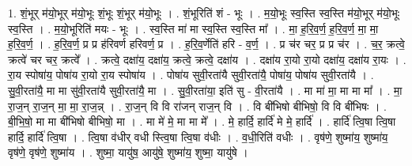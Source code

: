 \documentclass[17pt]{extarticle}
\begin{document}
1. शं॒भूर् म॑यो॒भूर् म॑यो॒भूः शं॒भूः शं॒भूर् म॑यो॒भूः । . शं॒भूरिति॑ शं - भूः । . म॒यो॒भूः स्व॒स्ति स्व॒स्ति म॑यो॒भूर् म॑यो॒भूः स्व॒स्ति । . म॒यो॒भूरिति॑ मयः - भूः । . स्व॒स्ति मा॑ मा स्व॒स्ति स्व॒स्ति मा᳚ । . मा॒ ह॒रि॒व॒र्ण॒ ह॒रि॒व॒र्ण॒ मा॒ मा॒ ह॒रि॒व॒र्ण॒ । . ह॒रि॒व॒र्ण॒ प्र प्र ह॑रिवर्ण हरिवर्ण॒ प्र । . ह॒रि॒व॒र्णेति॑ हरि - व॒र्ण॒ । . प्र च॑र चर॒ प्र प्र च॑र । . च॒र॒ क्रत्वे॒ क्रत्वे॑ चर चर॒ क्रत्वे᳚ । . क्रत्वे॒ दक्षा॑य॒ दक्षा॑य॒ क्रत्वे॒ क्रत्वे॒ दक्षा॑य । . दक्षा॑य रा॒यो रा॒यो दक्षा॑य॒ दक्षा॑य रा॒यः । . रा॒य स्पोषा॑य॒ पोषा॑य रा॒यो रा॒य स्पोषा॑य । . पोषा॑य सुवी॒रता॑यै सुवी॒रता॑यै॒ पोषा॑य॒ पोषा॑य सुवी॒रता॑यै । . सु॒वी॒रता॑यै॒ मा मा सु॑वी॒रता॑यै सुवी॒रता॑यै॒ मा । . सु॒वी॒रता॑या॒ इति॑ सु - वी॒रता॑यै । . मा मा॑ मा॒ मा मा मा᳚ । . मा॒ रा॒ज॒न् रा॒ज॒न् मा॒ मा॒ रा॒ज॒न्न् । . रा॒ज॒न् वि वि रा॑जन् राज॒न् वि । . वि बी॑भिषो बीभिषो॒ वि वि बी॑भिषः । . बी॒भि॒षो॒ मा मा बी॑भिषो बीभिषो॒ मा । . मा मे॑ मे॒ मा मा मे᳚ । . मे॒ हार्दि॒ हार्दि॑ मे मे॒ हार्दि॑ । . हार्दि॑ त्वि॒षा त्वि॒षा हार्दि॒ हार्दि॑ त्वि॒षा । . त्वि॒षा व॑धीर् वधी स्त्वि॒षा त्वि॒षा व॑धीः । . व॒धी॒रिति॑ वधीः । . वृष॑णे॒ शुष्मा॑य॒ शुष्मा॑य॒ वृष॑णे॒ वृष॑णे॒ शुष्मा॑य । . शुष्मा॒ यायु॑ष॒ आयु॑षे॒ शुष्मा॑य॒ शुष्मा॒ यायु॑षे । \newline
\end{document}
